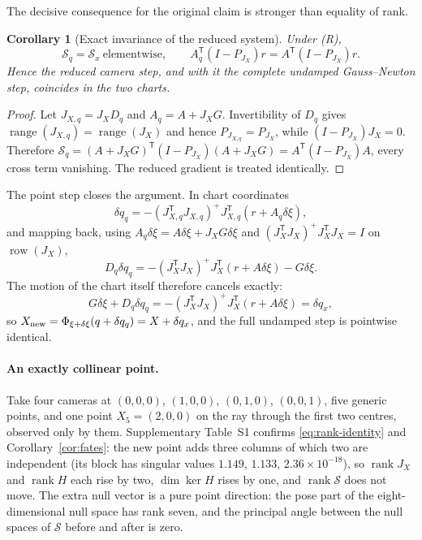 \documentclass[11pt,a4paper]{article}
\newtheorem{corollary}[theorem]{Corollary}
\theoremstyle{definition}
\theoremstyle{remark}
\DeclareMathOperator{\rank}{rank}
\newcommand{\T}{\mathsf{T}}
\begin{document}
The decisive consequence for the original claim is stronger than equality of rank.

\begin{corollary}[Exact invariance of the reduced system]\label{cor:reduced}
Under (R),
\begin{equation}
\mathcal S_q=\mathcal S_x\ \text{elementwise},
\qquad
A_q^{\T}(I-P_{J_X})r=A^{\T}(I-P_{J_X})r .
\label{eq:reduced-invariance}
\end{equation}
Hence the reduced camera step, and with it the complete undamped Gauss--Newton step, coincides in the two charts.
\end{corollary}
\begin{proof}
Let $J_{X,q}=J_XD_q$ and $A_q=A+J_XG$. Invertibility of $D_q$ gives $\operatorname{range}(J_{X,q})=\operatorname{range}(J_X)$ and hence $P_{J_{X,q}}=P_{J_X}$, while $(I-P_{J_X})J_X=0$. Therefore $\mathcal S_q=(A+J_XG)^{\T}(I-P_{J_X})(A+J_XG)=A^{\T}(I-P_{J_X})A$, every cross term vanishing. The reduced gradient is treated identically.
\end{proof}

The point step closes the argument. In chart coordinates
\begin{equation}
\delta q_q=-(J_{X,q}^{\T}J_{X,q})^{+}J_{X,q}^{\T}\left(r+A_q\delta\xi\right),
\end{equation}
and mapping back, using $A_q\delta\xi=A\delta\xi+J_XG\delta\xi$ and $(J_X^{\T}J_X)^{+}J_X^{\T}J_X=I$ on $\operatorname{row}(J_X)$,
\begin{equation}
D_q\delta q_q=-(J_X^{\T}J_X)^{+}J_X^{\T}(r+A\delta\xi)-G\delta\xi .
\label{eq:point-backsub}
\end{equation}
The motion of the chart itself therefore cancels exactly:
\begin{equation}
G\delta\xi+D_q\delta q_q=-(J_X^{\T}J_X)^{+}J_X^{\T}(r+A\delta\xi)=\delta q_x,
\label{eq:cancel}
\end{equation}
so $X_{\rm new}=\Phi_{\xi+\delta\xi}(q+\delta q_q)=X+\delta q_x$, and the full undamped step is pointwise identical.

\paragraph{An exactly collinear point.}
Take four cameras at $(0,0,0)$, $(1,0,0)$, $(0,1,0)$, $(0,0,1)$, five generic points, and one point $X_5=(2,0,0)$ on the ray through the first two centres, observed only by them. Supplementary Table~S1 confirms \eqref{eq:rank-identity} and Corollary~\ref{cor:fates}: the new point adds three columns of which two are independent (its block has singular values $1.149$, $1.133$, $2.36\times10^{-18}$), so $\rank J_X$ and $\rank H$ each rise by two, $\dim\ker H$ rises by one, and $\rank\mathcal S$ does not move. The extra null vector is a pure point direction: the pose part of the eight-dimensional null space has rank seven, and the principal angle between the null spaces of $\mathcal S$ before and after is zero.
\end{document}
